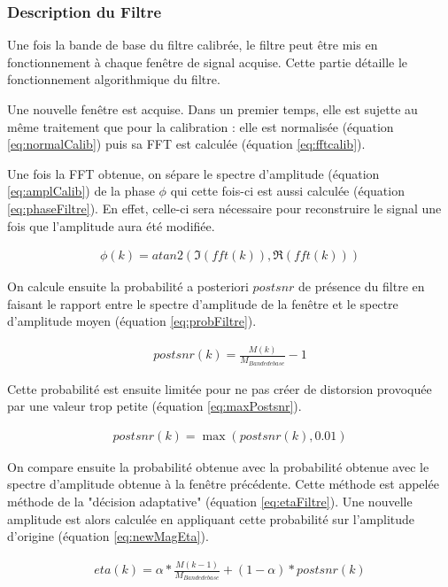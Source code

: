 \documentclass[letterpaper, twoside, 12pt, memoire, creativecommons, hyperref]{thETS}
\begin{document}
\subsubsection{Description du Filtre}

Une fois la bande de base du filtre calibrée, le filtre peut être mis en fonctionnement à chaque fenêtre de signal acquise. Cette partie détaille le fonctionnement algorithmique du filtre. 

Une nouvelle fenêtre est acquise. Dans un premier temps, elle est sujette au même traitement que pour la calibration : elle est normalisée (équation \ref{eq:normalCalib}) puis sa FFT est calculée (équation \ref{eq:fftcalib}).

Une fois la FFT obtenue, on sépare le spectre d'amplitude (équation \ref{eq:amplCalib}) de la phase $\phi$ qui cette fois-ci est aussi calculée (équation \ref{eq:phaseFiltre}). En effet, celle-ci sera nécessaire pour reconstruire le signal une fois que l'amplitude aura été modifiée.

\begin{align}\label{eq:phaseFiltre}
   \phi(k) = atan2(\Im(fft(k)), \Re(fft(k)))
\end{align}

On calcule ensuite la probabilité a posteriori $postsnr$ de présence du filtre en faisant le rapport entre le spectre d'amplitude de la fenêtre et le spectre d'amplitude moyen (équation \ref{eq:probFiltre}).

\begin{align}\label{eq:probFiltre}
   postsnr(k) = \frac{M(k)}{M_{Bande de base}} - 1
\end{align}

Cette probabilité est ensuite limitée pour ne pas créer de distorsion provoquée par une valeur trop petite (équation \ref{eq:maxPostsnr}).

\begin{align}\label{eq:maxPostsnr}
   postsnr(k) = \max(postsnr(k), 0.01)
\end{align}

On compare ensuite la probabilité obtenue avec la probabilité obtenue avec le spectre d'amplitude obtenue à la fenêtre précédente. Cette méthode est appelée méthode de la "décision adaptative" (équation \ref{eq:etaFiltre}). Une nouvelle amplitude est alors calculée en appliquant cette probabilité sur l'amplitude d'origine (équation \ref{eq:newMagEta}).

\begin{align}\label{eq:etaFiltre}
   eta(k) = \alpha * \frac{M(k-1)}{M_{Bande de base}} + (1 - \alpha) * postsnr(k)
\end{align}
\end{document}
